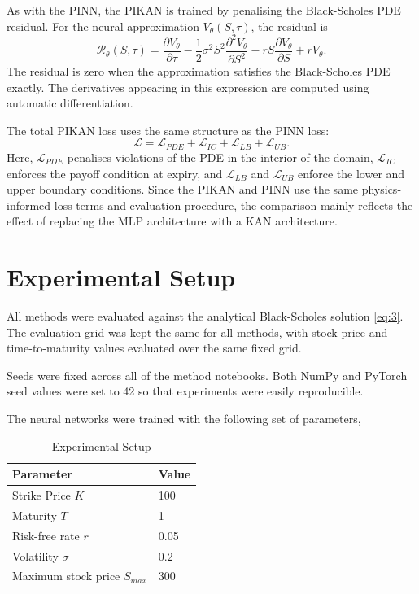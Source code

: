 \documentclass[11pt,a4paper]{article}
\begin{document}
As with the PINN, the PIKAN is trained by penalising the Black-Scholes PDE residual. For the neural approximation $V_\theta(S,\tau)$, the residual is
\[
\mathcal{R}_\theta(S,\tau)
=
\frac{\partial V_\theta}{\partial \tau}
-
\frac{1}{2}\sigma^2S^2
\frac{\partial^2 V_\theta}{\partial S^2}
-
rS\frac{\partial V_\theta}{\partial S}
+
rV_\theta.
\]
The residual is zero when the approximation satisfies the Black-Scholes PDE exactly. The derivatives appearing in this expression are computed using automatic differentiation.

The total PIKAN loss uses the same structure as the PINN loss:
\[
\mathcal{L}
=
\mathcal{L}_{PDE}
+
\mathcal{L}_{IC}
+
\mathcal{L}_{LB}
+
\mathcal{L}_{UB}.
\]
Here, $\mathcal{L}_{PDE}$ penalises violations of the PDE in the interior of the domain, $\mathcal{L}_{IC}$ enforces the payoff condition at expiry, and $\mathcal{L}_{LB}$ and $\mathcal{L}_{UB}$ enforce the lower and upper boundary conditions. Since the PIKAN and PINN use the same physics-informed loss terms and evaluation procedure, the comparison mainly reflects the effect of replacing the MLP architecture with a KAN architecture.

\section{Experimental Setup}

All methods were evaluated against the analytical Black-Scholes solution \eqref{eq:3}. The evaluation grid was kept the same for all methods, with stock-price and time-to-maturity values evaluated over the same fixed grid.

Seeds were fixed across all of the method notebooks. Both NumPy and PyTorch seed values were set to 42 so that experiments were easily reproducible.

The neural networks were trained with the following set of parameters,

\begin{table}[H]
\centering
\begin{tabular}{ll}
\toprule
Parameter & Value \\
\midrule
Strike Price $K$ & 100 \\
Maturity $T$ & 1 \\
Risk-free rate $r$ & 0.05 \\
Volatility $\sigma$ & 0.2 \\
Maximum stock price $S_{max}$ & 300 \\
\bottomrule
\end{tabular}
\caption{Experimental Setup}
\end{table}
\end{document}
